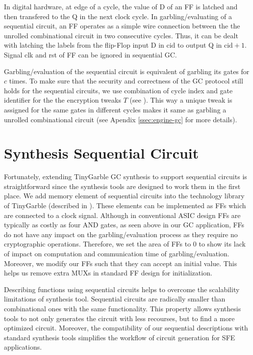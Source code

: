 In digital hardware, at edge of a cycle, the value of D of an FF is latched and then transfered to the Q in the next clock cycle.
In garbling/evaluating of a sequential circuit, an FF operates as a simple wire connection between the the unrolled combinational circuit in two consecutive cycles.
Thus, it can be dealt with latching the labels from the flip-Flop input D in $\textrm{cid}$ to output Q in $\textrm{cid}+1$.
Signal clk and rst of FF can be ignored in sequential GC.

Garbling/evaluation of the sequential circuit is equivalent of garbling its gates for $c$ times.
To make sure that the security and correctness of the GC protocol still holds for the sequential circuits, we use combination of cycle index and gate identifier for the the encryption tweaks $T$ (see ).
This way a unique tweak is assigned for the same gates in different cycles makes it same as garbling a unrolled combinational circuit (see Apendix \ref{ssec:engine-gc} for more details).

\section{Synthesis Sequential Circuit}
Fortunately, extending TinyGarble GC synthesis to support sequential circuits is straightforward since the synthesis tools are designed to work them in the first place.
We add memory element of sequential circuits into the technology library of TinyGarble (described in ).
These elements can be implemented as FFs which are connected to a clock signal.
Although in conventional ASIC design FFs are typically as costly as four AND gates, as seen above in our GC application, FFs do not have any impact on the garbling/evaluation process as they require no cryptographic operations.
Therefore, we set the area of FFs to 0 to show its lack of impact on computation and communication time of garbling/evaluation.
Moreover, we modify our FFs such that they can accept an initial value.
This helps us remove extra MUXs in standard FF design for initialization.

Describing functions using sequential circuits helps to overcome the scalability limitations of synthesis tool.
Sequential circuits are radically smaller than combinational ones with the same functionality.
This property allows synthesis tools to not only generates the circuit with less recourses, but to find a more optimized circuit.
Moreover, the compatibility of our sequential descriptions with standard synthesis tools simplifies the workflow of circuit generation for SFE applications.

